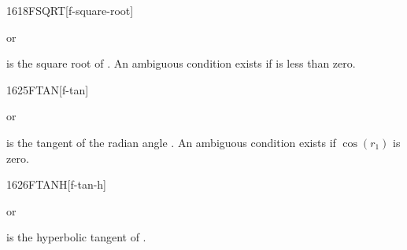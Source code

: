 \vspace*{-0.5ex}
\begin{worddef}{1618}{FSQRT}[f-square-root]
\item {} or

	 is the square root of . An ambiguous
	condition exists if  is less than zero.
\end{worddef}


\vspace*{-0.5ex}
\begin{worddef}{1625}{FTAN}[f-tan]
\item {} or

	 is the tangent of the radian angle . An
	ambiguous condition exists if $\cos(r_1)$ is zero.
\end{worddef}


\begin{worddef}{1626}{FTANH}[f-tan-h]
\item {} or

	 is the hyperbolic tangent of .
\end{worddef}


